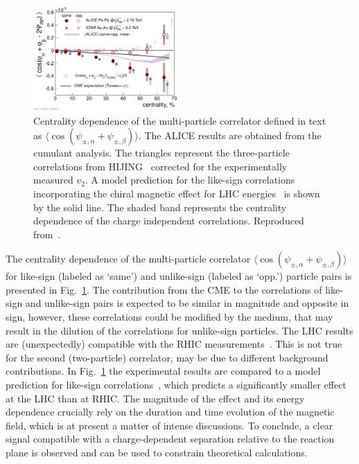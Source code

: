 \begin{figure}
\centering
\includegraphics[width=0.5\textwidth]{ksfigures/ChargeSepar.pdf}
\caption{Centrality dependence of the multi-particle correlator defined in text as $\langle \cos{(\psi_{\pm,\alpha} + \psi_{\pm,\beta})} \rangle$. The ALICE results are obtained from the cumulant analysis.  The triangles represent the three-particle correlations from HIJING~\cite{Wang:1991hta} corrected for the experimentally measured $v_2$. A model prediction for the like-sign correlations incorporating the chiral magnetic effect for LHC energies~\cite{Toneev:2010xt} is shown by the solid line. The shaded band represents the centrality dependence of the charge independent correlations. Reproduced from~\cite{Abelev:2012pa}.}
\label{figks:ChSep}
\end{figure}


The centrality dependence of the multi-particle correlator $\langle \cos{(\psi_{\pm,\alpha} + \psi_{\pm,\beta})} \rangle$ for like-sign (labeled as `same') and unlike-sign (labeled as `opp.') particle pairs is presented in Fig.~\ref{figks:ChSep}. The contribution from the CME to the correlations of like-sign and unlike-sign pairs is expected to be similar in magnitude and opposite in sign, however, these correlations could be modified by the medium, that may result in the dilution of the correlations for unlike-sign particles. The LHC results are (unexpectedly) compatible with the RHIC measurements~\cite{Abelev:2009ac}. This is not true for the second (two-particle) correlator, may be due to different background contributions. In Fig.~\ref{figks:ChSep} the experimental results are compared to a model prediction for like-sign correlations~\cite{Toneev:2010xt}, which predicts a significantly smaller effect at the LHC than at RHIC. The magnitude of the effect and its energy dependence crucially rely on the duration and time evolution of the magnetic field, which is at present a matter of intense discussions. To conclude, a clear signal compatible with a charge-dependent separation relative to the reaction plane is observed and can be used to constrain theoretical calculations.
